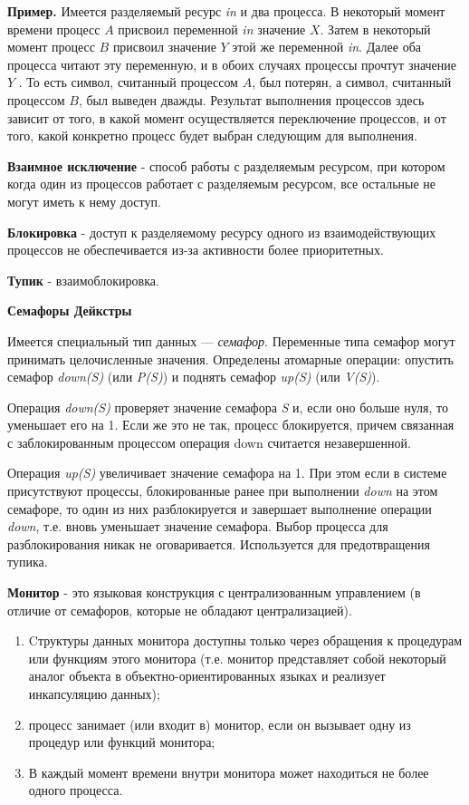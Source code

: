 \textbf{Пример.} Имеется разделяемый ресурс \textit{in} и два процесса. В некоторый момент времени процесс $A$ присвоил переменной \textit{in} значение $X$. Затем в некоторый момент процесс $B$ присвоил значение $Y$ этой же переменной \textit{in}. Далее оба процесса читают эту переменную, и в обоих случаях процессы прочтут значение $Y$ . То есть символ, считанный процессом $A$, был потерян, а символ, считанный процессом $B$, был выведен дважды. Результат выполнения процессов здесь зависит от того, в какой момент осуществляется переключение процессов, и от того, какой конкретно процесс будет выбран следующим для выполнения.

\textbf{Взаимное исключение} - способ работы с разделяемым ресурсом, при котором когда один из процессов работает с разделяемым ресурсом, все остальные не могут иметь к нему доступ.

\textbf{Блокировка} - доступ к разделяемому ресурсу одного из взаимодействующих процессов не обеспечивается из-за активности более приоритетных.

\textbf{Тупик} - взаимоблокировка.

\textbf{Семафоры Дейкстры}

Имеется специальный тип данных --- \textit{семафор}. Переменные типа семафор могут принимать целочисленные значения. Определены атомарные операции: опустить семафор \textit{down(S)} (или \textit{P(S)}) и поднять семафор \textit{up(S)} (или \textit{V(S)}).

Операция \textit{down(S)} проверяет значение семафора \textit{S} и, если оно больше нуля, то уменьшает его на 1. Если же это не так, процесс блокируется, причем связанная с заблокированным процессом операция down считается незавершенной.

Операция \textit{up(S)} увеличивает значение семафора на 1. При этом если в системе присутствуют процессы, блокированные ранее при выполнении \textit{down} на этом семафоре, то один из них разблокируется и завершает выполнение операции \textit{down}, т.е. вновь уменьшает значение семафора. Выбор процесса для разблокирования никак не оговаривается. Используется для предотвращения тупика. 

\textbf{Монитор} - это языковая конструкция с централизованным управлением (в отличие от семафоров, которые не обладают централизацией).
\begin{enumerate}
    \item Cтруктуры данных монитора доступны только через обращения к процедурам или функциям этого монитора (т.е. монитор представляет собой некоторый аналог объекта в объектно-ориентированных языках и реализует инкапсуляцию данных);
    \item процесс занимает (или входит в) монитор, если он вызывает одну из процедур или функций монитора;
    \item В каждый момент времени внутри монитора может находиться не более одного процесса.
\end{enumerate}

